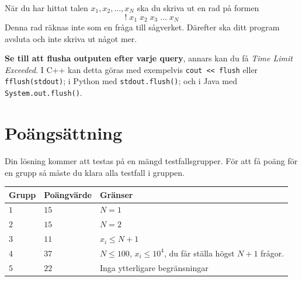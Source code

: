 När du har hittat talen $x_1, x_2, \dots, x_N$ ska du skriva ut en rad på formen 
$$! \; x_1 \; x_2 \; x_3 \; \dots \; x_N$$
Denna rad räknas inte som en fråga till sågverket. Därefter ska ditt program avsluta och 
inte skriva ut något mer.

\textbf{Se till att flusha outputen efter varje query}, annars kan du få \textit{Time Limit Exceeded}.
I C++ kan detta göras med exempelvis \texttt{cout << flush}
eller \texttt{fflush(stdout)};
i Python med \texttt{stdout.flush()};
och i Java med \texttt{System.out.flush()}.

\section*{Poängsättning}
Din lösning kommer att testas på en mängd testfallsgrupper.
För att få poäng för en grupp så måste du klara alla testfall i gruppen.

\noindent
\begin{tabular}{| l | l | p{12cm} |}
  \hline
  Grupp & Poängvärde & Gränser \\ \hline
  $1$   & $15$       & $N = 1$\\ \hline
  $2$   & $15$       & $N = 2$  \\ \hline
  $3$   & $11$       & $x_i \leq N+1$ \\ \hline
  $4$   & $37$       & $N \leq 100$, $x_i \leq 10^4$, du får ställa högst $N+1$ frågor. \\ \hline
  $5$   & $22$       & Inga ytterligare begränsningar \\ \hline
\end{tabular}